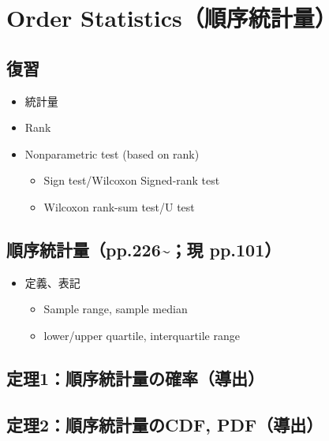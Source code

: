 \documentclass[
]{book}
\providecommand{\tightlist}{%
  \setlength{\itemsep}{0pt}\setlength{\parskip}{0pt}}
\begin{document}
\chapter{Order Statistics（順序統計量）}\label{order-statisticsux9806ux5e8fux7d71ux8a08ux91cf}

\section*{復習}\label{ux5fa9ux7fd2-2}

\begin{itemize}
\tightlist
\item
  統計量
\item
  Rank
\item
  Nonparametric test (based on rank)

  \begin{itemize}
  \tightlist
  \item
    Sign test/Wilcoxon Signed-rank test
  \item
    Wilcoxon rank-sum test/U test
  \end{itemize}
\end{itemize}

\section{順序統計量（pp.226\textasciitilde；現 pp.101）}\label{ux9806ux5e8fux7d71ux8a08ux91cfpp.226ux73fe-pp.101}

\begin{itemize}
\item
  定義、表記

  \begin{itemize}
  \tightlist
  \item
    Sample range, sample median
  \item
    lower/upper quartile, interquartile range
  \end{itemize}
\end{itemize}

\section{定理1：順序統計量の確率（導出）}\label{ux5b9aux74061ux9806ux5e8fux7d71ux8a08ux91cfux306eux78baux7387ux5c0eux51fa}

\section{定理2：順序統計量のCDF, PDF（導出）}\label{ux5b9aux74062ux9806ux5e8fux7d71ux8a08ux91cfux306ecdf-pdfux5c0eux51fa}
\end{document}

